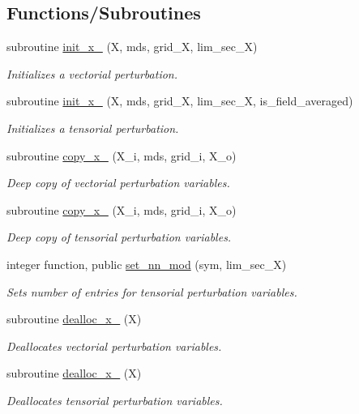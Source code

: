 \subsection*{Functions/\+Subroutines}
\begin{DoxyCompactItemize}
\item 
subroutine \hyperlink{namespacex__vars_a327c74a0fa8c50aa2ed812062bd82436}{init\+\_\+x\+\_} (X, mds, grid\+\_\+X, lim\+\_\+sec\+\_\+X)
\begin{DoxyCompactList}\small\item\em Initializes a vectorial perturbation. \end{DoxyCompactList}\item 
subroutine \hyperlink{namespacex__vars_a5cb61bfd7fbdae7bae2ec10b63160d74}{init\+\_\+x\+\_} (X, mds, grid\+\_\+X, lim\+\_\+sec\+\_\+X, is\+\_\+field\+\_\+averaged)
\begin{DoxyCompactList}\small\item\em Initializes a tensorial perturbation. \end{DoxyCompactList}\item 
subroutine \hyperlink{namespacex__vars_ae9744cbf1a4fc06080517a03ac43b960}{copy\+\_\+x\+\_} (X\+\_\+i, mds, grid\+\_\+i, X\+\_\+o)
\begin{DoxyCompactList}\small\item\em Deep copy of vectorial perturbation variables. \end{DoxyCompactList}\item 
subroutine \hyperlink{namespacex__vars_aeaa25b69e4ef9cc5882c9dcf894201d7}{copy\+\_\+x\+\_} (X\+\_\+i, mds, grid\+\_\+i, X\+\_\+o)
\begin{DoxyCompactList}\small\item\em Deep copy of tensorial perturbation variables. \end{DoxyCompactList}\item 
integer function, public \hyperlink{namespacex__vars_a90d744aee4358a8cc35d29304d1bb120}{set\+\_\+nn\+\_\+mod} (sym, lim\+\_\+sec\+\_\+X)
\begin{DoxyCompactList}\small\item\em Sets number of entries for tensorial perturbation variables. \end{DoxyCompactList}\item 
subroutine \hyperlink{namespacex__vars_a20679fb70a3dbfcdf2479b1219b847d1}{dealloc\+\_\+x\+\_} (X)
\begin{DoxyCompactList}\small\item\em Deallocates vectorial perturbation variables. \end{DoxyCompactList}\item 
subroutine \hyperlink{namespacex__vars_ac052defbe764e6d02f436bd29d72db6d}{dealloc\+\_\+x\+\_} (X)
\begin{DoxyCompactList}\small\item\em Deallocates tensorial perturbation variables. \end{DoxyCompactList}\end{DoxyCompactItemize}
